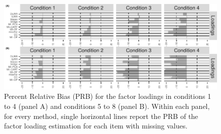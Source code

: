 \begin{figure}[h]
	\includegraphics{../../output/graphs/exp2_CFA_lambda_BPR.pdf}
	\caption{
		Percent Relative Bias (PRB) for the factor loadings in conditions 1 to 4 (panel A) 
		and conditions 5 to 8 (panel B).
		Within each panel, for every method, single horizontal lines report the PRB of the 
		factor loading estimation for each item with missing values.
		}
\label{fig:exp2fl14}
\end{figure}

\FloatBarrier %

